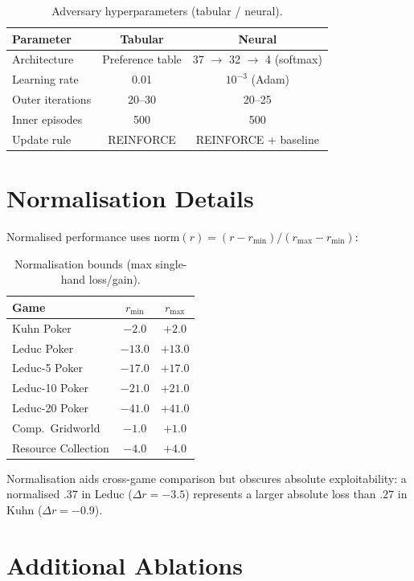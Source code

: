 \documentclass{article}
\begin{document}
\begin{table}[ht]
\centering
\caption{Adversary hyperparameters (tabular / neural).}
\begin{tabular}{lcc}
\toprule
Parameter & Tabular & Neural \\
\midrule
Architecture & Preference table & 37 $\to$ 32 $\to$ 4 (softmax) \\
Learning rate & 0.01 & $10^{-3}$ (Adam) \\
Outer iterations & 20--30 & 20--25 \\
Inner episodes & 500 & 500 \\
Update rule & REINFORCE & REINFORCE + baseline \\
\bottomrule
\end{tabular}
\end{table}

\section{Normalisation Details}
\label{app:normalisation}

Normalised performance uses $\text{norm}(r) = (r - r_{\min}) / (r_{\max} - r_{\min})$:

\begin{table}[ht]
\centering
\caption{Normalisation bounds (max single-hand loss/gain).}
\begin{tabular}{lcc}
\toprule
Game & $r_{\min}$ & $r_{\max}$ \\
\midrule
Kuhn Poker & $-2.0$ & $+2.0$ \\
Leduc Poker & $-13.0$ & $+13.0$ \\
Leduc-5 Poker & $-17.0$ & $+17.0$ \\
Leduc-10 Poker & $-21.0$ & $+21.0$ \\
Leduc-20 Poker & $-41.0$ & $+41.0$ \\
Comp.\ Gridworld & $-1.0$ & $+1.0$ \\
Resource Collection & $-4.0$ & $+4.0$ \\
\bottomrule
\end{tabular}
\end{table}

Normalisation aids cross-game comparison but obscures absolute exploitability: a normalised $.37$ in Leduc ($\Delta r = -3.5$) represents a larger absolute loss than $.27$ in Kuhn ($\Delta r = -0.9$).

\section{Additional Ablations}
\label{app:ablations}
\end{document}
